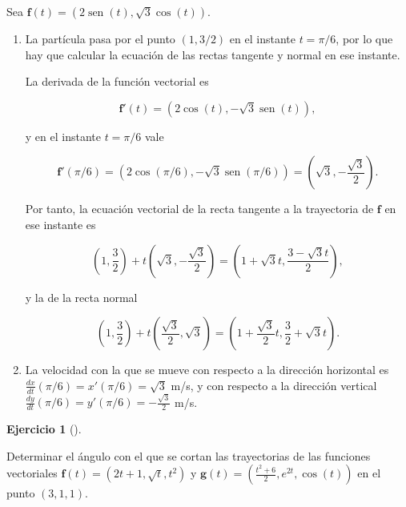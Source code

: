 \documentclass[
  spanish,
  a4paper,
]{scrreport}
\theoremstyle{definition}
\newtheorem{exercise}{Ejercicio}[chapter]
\theoremstyle{remark}
\begin{document}
\begin{tcolorbox}[enhanced jigsaw, arc=.35mm, bottomrule=.15mm, bottomtitle=1mm, breakable, colback=white, colbacktitle=quarto-callout-tip-color!10!white, colframe=quarto-callout-tip-color-frame, coltitle=black, left=2mm, leftrule=.75mm, opacityback=0, opacitybacktitle=0.6, rightrule=.15mm, title=\textcolor{quarto-callout-tip-color}{\faLightbulb}\hspace{0.5em}{Solución}, titlerule=0mm, toprule=.15mm, toptitle=1mm]

Sea \(\mathbf{f}(t)=(2\operatorname{sen}(t), \sqrt{3}\cos(t))\).

\begin{enumerate}
\def\labelenumi{\alph{enumi}.}
\item
  La partícula pasa por el punto \((1,3/2)\) en el instante \(t=\pi/6\),
  por lo que hay que calcular la ecuación de las rectas tangente y
  normal en ese instante.

  La derivada de la función vectorial es

  \[
  \mathbf{f}'(t) = (2\cos(t), -\sqrt{3}\operatorname{sen}(t)),
  \]

  y en el instante \(t=\pi/6\) vale

  \[
  \mathbf{f}'(\pi/6) = (2\cos(\pi/6), -\sqrt{3}\operatorname{sen}(\pi/6)) = \left(\sqrt{3},-\frac{\sqrt{3}}{2}\right).
  \]

  Por tanto, la ecuación vectorial de la recta tangente a la trayectoria
  de \(\mathbf{f}\) en ese instante es

  \[
  \left(1,\frac{3}{2}\right)+ t\left(\sqrt{3},-\frac{\sqrt{3}}{2}\right) 
  = \left(1+\sqrt{3}t,\frac{3-\sqrt{3}t}{2}\right),
  \]

  y la de la recta normal

  \[
  \left(1,\frac{3}{2}\right)+ t\left(\frac{\sqrt{3}}{2},\sqrt{3}\right) 
  = \left(1+\frac{\sqrt{3}}{2}t,\frac{3}{2}+\sqrt{3}t\right).
  \]
\item
  La velocidad con la que se mueve con respecto a la dirección
  horizontal es \(\frac{dx}{dt} (\pi/6) = x'(\pi/6) = \sqrt{3}\) m/s, y
  con respecto a la dirección vertical
  \(\frac{dy}{dt} (\pi/6) = y'(\pi/6) = -\frac{\sqrt{3}}{2}\) m/s.
\end{enumerate}

\end{tcolorbox}

\begin{exercise}[]\protect\hypertarget{exr-angulo-entre-trayectorias}{}\label{exr-angulo-entre-trayectorias}

Determinar el ángulo con el que se cortan las trayectorias de las
funciones vectoriales \(\mathbf{f}(t) = (2t+1, \sqrt{t}, t^2)\) y
\(\mathbf{g}(t)=\left(\frac{t^2+6}{2}, e^{2t}, \cos(t)\right)\) en el
punto \((3,1,1)\).

\end{exercise}
\end{document}
